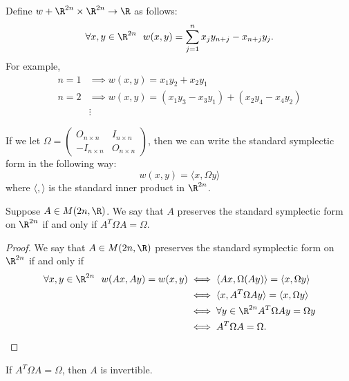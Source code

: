 \begin{eg}
   Define \( w + \R^{2n} \times \R^{2n} \to \R  \) as follows:
   \[  \forall x,y \in \R^{2n} \ \ w(x,y) = \sum_{ j=1  }^{ n } {x}_{j} {y}_{n+j} - {x}_{n+j} {y}_{j}. \]
   For example, 
   \begin{align*}
       n = 1 &\implies w(x,y) = {x}_{1} {y}_{2} + {x}_{2} {y}_{1} \\
       n = 2 &\implies w(x,y) = ({x}_{1} {y}_{3} - {x}_{3} {y}_{1}) + ({x}_{2} {y}_{4} - {x}_{4} {y}_{2}) \\
             &\vdots 
   \end{align*}
\end{eg}

If we let \( \Omega = \begin{pmatrix} {O}_{n \times n}  & {I}_{n \times n } \\ - {I}_{n \times n } & {O}_{n \times n } \end{pmatrix}  \), then we can write the standard symplectic form in the following way:
\[  w(x,y) = \langle x ,  \Omega y \rangle \]
where \( \langle  ,  \rangle  \) is the standard inner product in \( \R^{2n} \). 

\begin{prop}
   Suppose \( A \in M(2n, \R) \). We say that \( A  \) preserves the standard symplectic form on \( \R^{2n} \) if and only if \( A^{T} \Omega A = \Omega \). 
\end{prop}
\begin{proof}
    We say that \( A \in M(2n, \R )  \) preserves the standard symplectic form on \( \R^{2n} \) if and only if 
    \begin{align*}
    \forall x,y \in \R^{2n} \ \ w(Ax, Ay) = w(x,y) &\iff \langle Ax , \Omega (Ay) \rangle = \langle x , \Omega y \rangle \\ 
                                                   &\iff \langle x  ,  A^{T} \Omega A y \rangle = \langle x ,  \Omega y \rangle \\
                                                   &\iff  \forall y \in \R^{2n} A^{T} \Omega A y  = \Omega y \\
                                                   &\iff A^{T} \Omega A = \Omega.
\end{align*}
\end{proof}

\begin{prop}
   If \( A^{T} \Omega A = \Omega  \), then \( A  \) is invertible. 
\end{prop}


